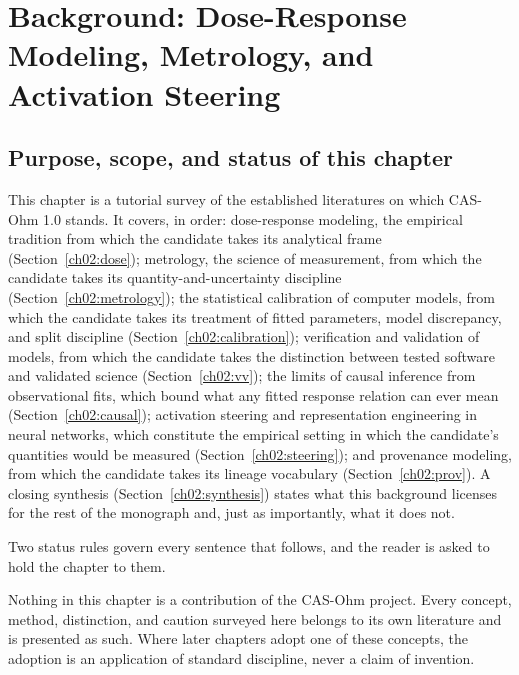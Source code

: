 \chapter{Background: Dose-Response Modeling, Metrology, and Activation Steering}\label{ch02:background}

\section{Purpose, scope, and status of this chapter}\label{ch02:purpose}

This chapter is a tutorial survey of the established literatures on which CAS-Ohm 1.0 stands. It covers, in order: dose-response modeling, the empirical tradition from which the candidate takes its analytical frame (Section~\ref{ch02:dose}); metrology, the science of measurement, from which the candidate takes its quantity-and-uncertainty discipline (Section~\ref{ch02:metrology}); the statistical calibration of computer models, from which the candidate takes its treatment of fitted parameters, model discrepancy, and split discipline (Section~\ref{ch02:calibration}); verification and validation of models, from which the candidate takes the distinction between tested software and validated science (Section~\ref{ch02:vv}); the limits of causal inference from observational fits, which bound what any fitted response relation can ever mean (Section~\ref{ch02:causal}); activation steering and representation engineering in neural networks, which constitute the empirical setting in which the candidate's quantities would be measured (Section~\ref{ch02:steering}); and provenance modeling, from which the candidate takes its lineage vocabulary (Section~\ref{ch02:prov}). A closing synthesis (Section~\ref{ch02:synthesis}) states what this background licenses for the rest of the monograph and, just as importantly, what it does not.

Two status rules govern every sentence that follows, and the reader is asked to hold the chapter to them.

\begin{ruleenv}\label{ch02:rule:notnovel}
Nothing in this chapter is a contribution of the CAS-Ohm project. Every concept, method, distinction, and caution surveyed here belongs to its own literature and is presented as such. Where later chapters adopt one of these concepts, the adoption is an application of standard discipline, never a claim of invention.
\end{ruleenv}

